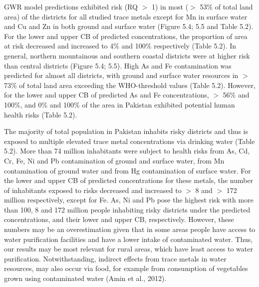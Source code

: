 GWR model predictions exhibited risk (RQ $>$ 1) in most ($>$ 53\% of total land area) of the districts for all studied trace metals except for Mn in surface water and Cu and Zn in both ground and surface water (Figure 5.4; 5.5 and Table 5.2). For the lower and upper CB of predicted concentrations, the proportion of area at risk decreased and increased to 4\% and 100\% respectively (Table 5.2). In general, northern mountainous and southern coastal districts were at higher risk than central districts (Figure 5.4; 5.5). High As and Fe contamination was predicted for almost all districts, with ground and surface water resources in $>$ 73\% of total land area exceeding the WHO-threshold values (Table 5.2). However, for the lower and upper CB of predicted As and Fe concentrations, $>$ 56\% and 100\%, and 0\% and 100\% of the area in Pakistan exhibited potential human health risks (Table 5.2).

The majority of total population in Pakistan inhabits risky districts and thus is exposed to multiple elevated trace metal concentrations via drinking water (Table 5.2). More than 74 million inhabitants were subject to health risks from As, Cd, Cr, Fe, Ni and Pb contamination of ground and surface water, from Mn contamination of ground water and from Hg contamination of surface water. For the lower and upper CB of predicted concentrations for these metals, the number of inhabitants exposed to risks decreased and increased to $>$ 8 and $>$ 172 million respectively, except for Fe. As, Ni and Pb pose the highest risk with more than 100, 8 and 172 million people inhabiting risky districts under the predicted concentrations, and their lower and upper CB, respectively. However, these numbers may be an overestimation given that in some areas people have access to water purification facilities and have a lower intake of contaminated water. Thus, our results may be most relevant for rural areas, which have least access to water purification. Notwithstanding, indirect effects from trace metals in water resources, may also occur via food, for example from consumption of vegetables grown using contaminated water (Amin et al., 2012).

